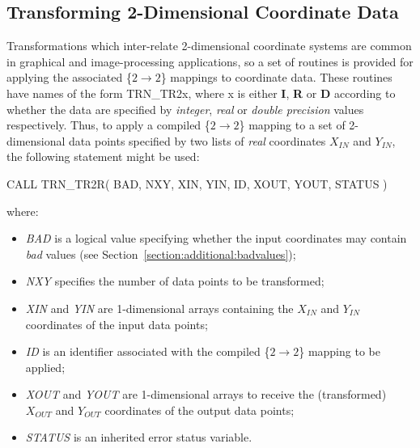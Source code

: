 \documentclass[twoside,nolof,11pt]{starlink}
\providecommand{\name}[1]{\small{#1}}
\providecommand{\fortvar}[1]{\emph{#1}}
\begin{document}
\subsection{Transforming 2-Dimensional Coordinate Data}

\label{section:simple:2ddata}

Transformations which inter-relate 2-dimensional coordinate systems are
common in graphical and image-processing applications, so a set of routines
is provided for applying the associated \mbox{\{$2 \rightarrow 2$\}}
mappings to coordinate data.
These routines have names of the form \name{TRN\_TR2x}, where x is either
\textbf{I}, \textbf{R} or \textbf{D} according to whether the data are
specified by
\emph{integer}, \emph{real} or \emph{double precision} values respectively.
Thus, to apply a compiled \mbox{\{$2 \rightarrow 2$\}} mapping to a set of
2-dimensional data points specified by two lists of \emph{real} coordinates
$X_{IN}$ and $Y_{IN}$, the following statement might be used:

\begin{terminalv}
CALL TRN_TR2R( BAD, NXY, XIN, YIN, ID, XOUT, YOUT, STATUS )
\end{terminalv}

where:

\begin{itemize}

\item \fortvar{BAD} is a logical value specifying whether the input
coordinates may contain \emph{bad} values (see
Section~\ref{section:additional:badvalues});

\item \fortvar{NXY} specifies the number of data points to be transformed;

\item \fortvar{XIN} and \fortvar{YIN} are 1-dimensional arrays containing
the $X_{IN}$ and $Y_{IN}$ coordinates of the input data points;

\item \fortvar{ID} is an identifier associated with the compiled
\mbox{\{$2 \rightarrow 2$\}} mapping to be applied;

\item \fortvar{XOUT} and \fortvar{YOUT} are 1-dimensional arrays to receive
the (transformed) $X_{OUT}$ and $Y_{OUT}$ coordinates of the output data
points;

\item \fortvar{STATUS} is an inherited error status variable.

\end{itemize}
\end{document}

